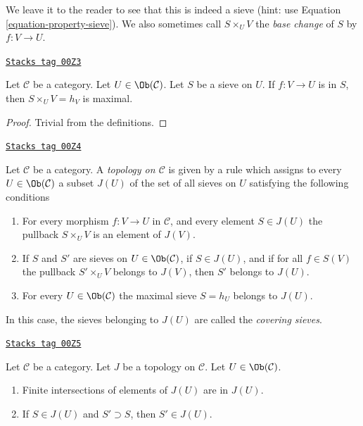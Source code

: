 We leave it to the reader to see that this is indeed a sieve
(hint: use Equation \ref{equation-property-sieve}).
We also sometimes call $S \times_U V$ the {\it base change}
of $S$ by $f : V \to U$.

\begin{lemma}
\label{sites-lemma-pullback-sieve-section}
\href{https://stacks.math.columbia.edu/tag/00Z3}{\texttt{Stacks tag 00Z3}}

Let $\mathcal{C}$ be a category.
Let $U \in \Ob(\mathcal{C})$.
Let $S$ be a sieve on $U$.
If $f : V \to U$ is in $S$, then
$S \times_U V = h_V$ is maximal.
\end{lemma}

\begin{proof}
Trivial from the definitions.
\end{proof}

\begin{definition}[Topology]
\label{sites-definition-topology}
\href{https://stacks.math.columbia.edu/tag/00Z4}{\texttt{Stacks tag 00Z4}}

Let $\mathcal{C}$ be a category. A {\it topology on $\mathcal{C}$} is given
by a rule which assigns to every $U \in \Ob(\mathcal{C})$
a subset $J(U)$ of the set of all sieves on $U$ satisfying
the following conditions
\begin{enumerate}
\item For every morphism $f : V \to U$ in $\mathcal{C}$, and
every element $S \in J(U)$ the pullback $S \times_U V$
is an element of $J(V)$.
\item If $S$ and $S'$ are sieves on $U \in \Ob(\mathcal{C})$,
if $S \in J(U)$, and if for all $f \in S(V)$ the pullback
$S' \times_U V$ belongs to $J(V)$, then $S'$ belongs to $J(U)$.
\item For every $U \in \Ob(\mathcal{C})$ the
maximal sieve $S = h_U$ belongs to $J(U)$.
\end{enumerate}
\end{definition}

In this case, the sieves belonging to $J(U)$ are called
the {\it covering sieves}.

\begin{lemma}
\label{sites-lemma-topology-basic}
\href{https://stacks.math.columbia.edu/tag/00Z5}{\texttt{Stacks tag 00Z5}}

Let $\mathcal{C}$ be a category.
Let $J$ be a topology on $\mathcal{C}$.
Let $U \in \Ob(\mathcal{C})$.
\begin{enumerate}
\item Finite intersections of elements of $J(U)$ are in $J(U)$.
\item If $S \in J(U)$ and $S' \supset S$, then $S' \in J(U)$.
\end{enumerate}
\end{lemma}

